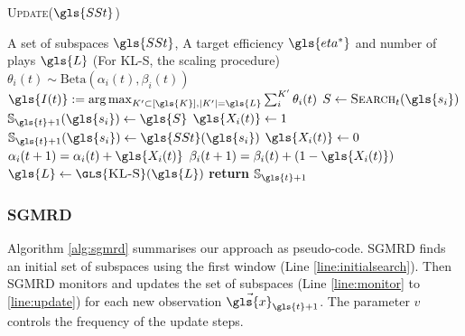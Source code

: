 \begin{algorithm}[ht]
	\footnotesize
	\caption{\textsc{Update}($\gls{SSt}$)}\label{SGMRD-Update} 
	\begin{algorithmic}[1]
		\Require A set of subspaces $\gls{SSt}$, A target efficiency $ \gls{eta^*}$ and number of plays $\gls{L}$ (For \textsc{\gls{KL-S}}, the scaling procedure)
		\State $\theta_i(t) \sim \text{Beta}(\alpha_i(t), \beta_i(t))$ 
		\EndFor 
		\State $ \gls{I(t)} := \argmax_{K' \subset [ \gls{K}], |K'| = \gls{L}} \sum_{i}^{K'}\theta_i(t)$
		\State $S \gets \textsc{Search}_t(\gls{s_i})$  
		\State $\mathbb{S}_{{\gls{t}}+1}(\gls{s_i}) \gets \gls{S}$
		\State $\gls{X_i(t)} \gets 1$
		\Else 
		\State $\mathbb{S}_{{\gls{t}}+1}(\gls{s_i}) \gets \gls{SSt}(\gls{s_i})$
		\State $\gls{X_i(t)} \gets 0$
		\EndIf
		\State $\alpha_i(t+1) = \alpha_i(t) +  \gls{X_i(t)}$  
		\State $\beta_i(t+1) = \beta_i(t) + (1- \gls{X_i(t)})$ 
		\State $\gls{L} \gets \textsc{\gls{KL-S}}(\gls{L})$ 
		\EndFor
		\State \textbf{return} $\mathbb{S}_{{\gls{t}}+1}$
	\end{algorithmic}
	
\end{algorithm}

\subsubsection{\gls{SGMRD}}

Algorithm \ref{alg:sgmrd} summarises our approach as pseudo-code. \gls{SGMRD} finds an initial set of subspaces using the first window (Line \ref{line:initialsearch}). 
Then SGMRD monitors and updates the set of subspaces (Line \ref{line:monitor} to \ref{line:update}) for each new observation $\vec{\gls{x}}_{{\gls{t}}+1}$. The parameter $v$ controls the frequency of the update steps. 

